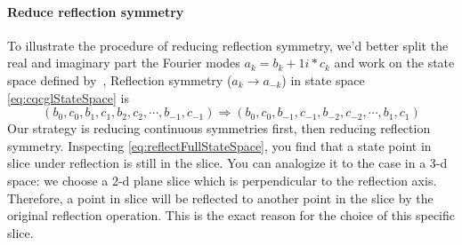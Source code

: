 \paragraph{Reduce reflection symmetry}
To illustrate the procedure of reducing reflection symmetry, we'd better split the
real and imaginary part the Fourier modes $a_k = b_k+ 1i*c_k$
and work on the state space defined by
\,,
Reflection symmetry ($a_k \to a_{-k}$) in state space \eqref{eq:cqcglStateSpace} is
\begin{equation}
(b_0, c_0, b_1, c_1, b_2, c_2, \cdots, b_{-1}, c_{-1})
  \Rightarrow
(b_0, c_0, b_{-1}, c_{-1}, b_{-2}, c_{-2}, \cdots, b_{1}, c_{1})
  \label{eq:reflectFullStateSpace}
\end{equation}
Our strategy is reducing continuous symmetries first, then reducing reflection symmetry.
Inspecting \eqref{eq:reflectFullStateSpace}, you find that
a state point in slice under reflection is still in the slice.
You can analogize it to
the case in a 3-d space: we choose a 2-d plane slice which is perpendicular
to the reflection axis. Therefore, a point in slice will be reflected to another
point in the slice by the original reflection operation. This is the exact reason
for the choice of this specific slice.

